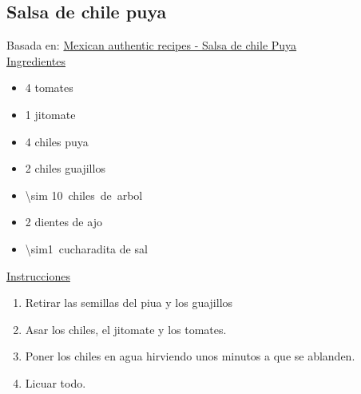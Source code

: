 \subsection{Salsa de chile puya}

Basada en: \href{http://www.mexican-authentic-recipes.com/salsa_y_dips-salsa_chile_puya.html}{Mexican authentic recipes - Salsa de chile Puya}\\

\underline{Ingredientes}
\begin{itemize}
\item 4 tomates
\item 1 jitomate
\item 4 chiles puya
\item 2 chiles guajillos
\item \SI{\sim 10} chiles de arbol
\item 2 dientes de ajo
\item \SI{\sim1}{cucharadita} de sal
\end{itemize}

\underline{Instrucciones}
\begin{enumerate}
\item Retirar las semillas del piua y los guajillos
\item Asar los chiles, el jitomate y los tomates.
\item Poner los chiles en agua hirviendo unos minutos a que se ablanden.
\item Licuar todo.
\end{enumerate}